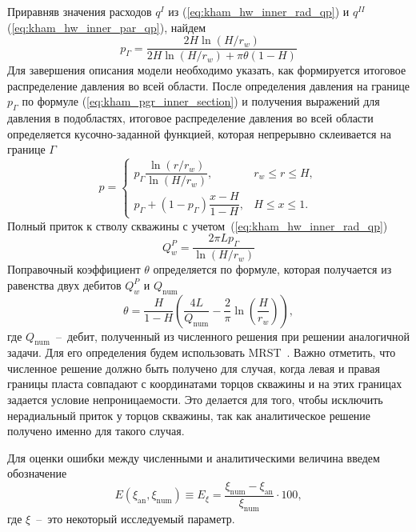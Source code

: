 \documentclass{article}
\begin{document}
Приравняв значения расходов $q^I$ из (\ref{eq:kham_hw_inner_rad_qp})
и $q^{II}$ (\ref{eq:kham_hw_inner_par_qp}), найдем
\begin{equation}
  \displaystyle
  p_{\Gamma} = \dfrac{2 H \ln{\left(H/r_w\right)}}{2 H \ln{\left(H/r_w\right)
  + \pi \theta \left(1 - H\right)}}
  \label{eq:kham_pgr_inner_section}
\end{equation}
Для завершения описания модели необходимо указать, как формируется итоговое
распределение давления во всей области. После определения давления на
границе $p_{\Gamma}$ по формуле (\ref{eq:kham_pgr_inner_section}) и получения
выражений для давления в подобластях, итоговое распределение давления во всей
области определяется кусочно-заданной функцией, которая непрерывно склеивается
на границе
$\Gamma$
\begin{equation}
  p =
  \begin{cases}
    p_{\Gamma} \dfrac{\ln{\left(r/r_w\right)}}{\ln{\left(H/r_w\right)}}, & r_w \leq r \leq H, \\
    p_{\Gamma} + (1 - p_{\Gamma})\dfrac{x - H}{1-H}, & H \leq x \leq 1.
  \end{cases}
  \label{eq:kham_hw_innerotal_pressure}
\end{equation}
Полный приток к стволу скважины с учетом~(\ref{eq:kham_hw_inner_rad_qp})
\begin{equation}
  \displaystyle
  Q_w^P = \dfrac{2\pi L p_{\Gamma}}{\ln{\left(H/r_w\right)}}
  \label{eq:kham_qw_inner}
\end{equation}
Поправочный коэффициент $\theta$ определяется по формуле, которая получается
из равенства двух дебитов $Q_w^P$ и $Q_{\text{num}}$
\begin{equation}
  \displaystyle
  \theta = \dfrac{H}{1-H} \left(\dfrac{4L}{Q_{\text{num}}}
  - \dfrac{2}{\pi} \ln \left(\dfrac{H}{r_w}\right)\right),
  \label{eq:kham_theta_inner}
\end{equation}
где $Q_{\text{num}}$~--~дебит, полученный из численного решения при решении
аналогичной задачи. Для его определения будем использовать MRST~\cite{lit:kham_mrst}.
Важно отметить, что численное решение должно быть получено для случая, когда левая
и правая границы пласта совпадают с координатами торцов скважины и на этих границах
задается условие непроницаемости. Это делается для того, чтобы исключить
нерадиальный приток у торцов скважины, так как аналитическое решение получено
именно для такого случая.

Для оценки ошибки между численными и аналитическими величина введем обозначение
\begin{equation}
  \displaystyle
  E \left(\xi_{\text{an}}, \xi_{\text{num}}\right) \equiv E_{\xi} = \dfrac{\xi_{\text{num}} - \xi_{\text{an}}}{\xi_{\text{num}}} \cdot 100,
  \label{eq:kham_common_residual}
\end{equation}
где $\xi$~--~это некоторый исследуемый параметр.
\end{document}
